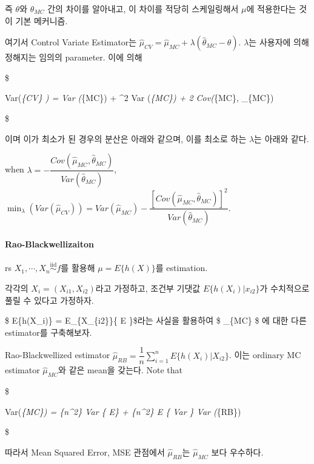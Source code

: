 \documentclass[
]{book}
\begin{document}
즉 \(\theta\)와 \(\theta_{MC}\) 간의 차이를 알아내고, 이 차이를 적당히 스케일링해서 \(\mu\)에 적용한다는 것이 기본 메커니즘.

여기서 Control Variate Estimator는 \(\hat \mu_{CV} = \hat \mu_{MC} + \lambda(\hat \theta_{MC} - \theta)\). \(\lambda\)는 사용자에 의해 정해지는 임의의 parameter. 이에 의해

\$

Var(\hat \mu\emph{\{CV\} ) = Var (\hat \mu}\{MC\}) + \lambda\^{}2 Var (\hat \theta\emph{\{MC\}) + 2 \lambda Cov(\hat \mu}\{MC\}, \theta\_\{MC\})

\$

이며 이가 최소가 된 경우의 분산은 아래와 같으며, 이를 최소로 하는 \(\lambda\)는 아래와 같다.

when \(\lambda = - \dfrac {Cov(\hat \mu_{MC}, \hat \theta_{MC})}{Var(\hat \theta_{MC})}\), \(\min_\lambda \left( Var(\hat \mu_{CV} ) \right) = Var(\hat \mu_{MC}) - \dfrac{\left[ Cov(\hat \mu_{MC}, \hat \theta_{MC}) \right]^2} {Var(\hat \theta_{MC})}\).

\hypertarget{rao-blackwellizaiton}{%
\paragraph{Rao-Blackwellizaiton}\label{rao-blackwellizaiton}}

rs \(X_1 , \cdots, X_n \overset {\text{iid}}{\sim} f\)를 활용해 \(\mu = E \{ h(X) \}\)를 estimation.

각각의 \(X_i = (X_{i1}, X_{i2})\)라고 가정하고, 조건부 기댓값 \(E\{ h(X_i) \rvert x_{i2} \}\)가 수치적으로 풀릴 수 있다고 가정하자.

\$ E\{h(X\_i)\} = E\_\{X\_\{i2\}\}\{ E  \}\$라는 사실을 활용하여 \$ \hat \mu\_\{MC\} \$ 에 대한 다른 estimator를 구축해보자.

Rao-Blackwellized estimator \(\hat \mu_{RB} = \dfrac 1 n \sum_{i=1}^n E \{ h(X_i) \rvert X_{i2} \}\). 이는 ordinary MC estimator \(\hat \mu_{MC}\)와 같은 mean을 갖는다. Note that

\$

Var(\hat \mu\emph{\{MC\}) =  \{n\^{}2\} Var \left\{ E \right\} +  \{n\^{}2\} E \left\{ Var  \right\} \ge Var (\hat \mu}\{RB\})

\$

따라서 Mean Squared Error, MSE 관점에서 \(\hat \mu_{RB}\)는 \(\hat \mu_{MC}\) 보다 우수하다.
\end{document}
